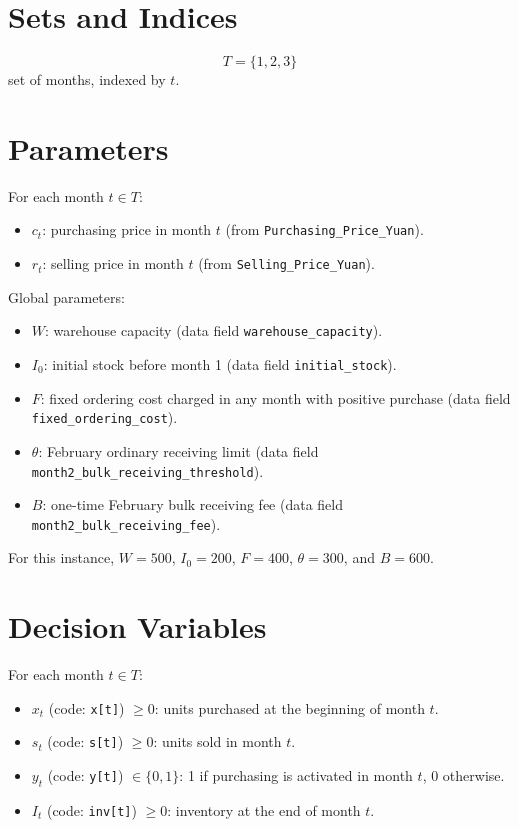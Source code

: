 \section*{Sets and Indices}

\[
T=\{1,2,3\}
\]
set of months, indexed by \(t\).

\section*{Parameters}

For each month \(t\in T\):
\begin{itemize}
  \item \(c_t\): purchasing price in month \(t\) (from \texttt{Purchasing\_Price\_Yuan}).
  \item \(r_t\): selling price in month \(t\) (from \texttt{Selling\_Price\_Yuan}).
\end{itemize}

Global parameters:
\begin{itemize}
  \item \(W\): warehouse capacity (data field \texttt{warehouse\_capacity}).
  \item \(I_0\): initial stock before month 1 (data field \texttt{initial\_stock}).
  \item \(F\): fixed ordering cost charged in any month with positive purchase (data field \texttt{fixed\_ordering\_cost}).
  \item \(\theta\): February ordinary receiving limit (data field \texttt{month2\_bulk\_receiving\_threshold}).
  \item \(B\): one-time February bulk receiving fee (data field \texttt{month2\_bulk\_receiving\_fee}).
\end{itemize}

For this instance, \(W=500\), \(I_0=200\), \(F=400\), \(\theta=300\), and \(B=600\).

\section*{Decision Variables}

For each month \(t\in T\):
\begin{itemize}
  \item \(x_t\) (code: \texttt{x[t]}) \(\ge 0\): units purchased at the beginning of month \(t\).
  \item \(s_t\) (code: \texttt{s[t]}) \(\ge 0\): units sold in month \(t\).
  \item \(y_t\) (code: \texttt{y[t]}) \(\in \{0,1\}\): 1 if purchasing is activated in month \(t\), 0 otherwise.
  \item \(I_t\) (code: \texttt{inv[t]}) \(\ge 0\): inventory at the end of month \(t\).
\end{itemize}

